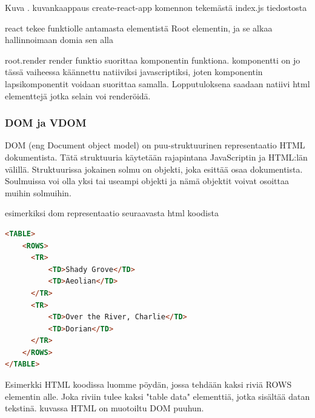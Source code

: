 Kuva \getImgCount{}. kuvankaappaus create-react-app komennon tekemästä index.js tiedostosta
\medskip

react tekee funktiolle antamasta elementistä Root elementin, ja se alkaa hallinnoimaan domia sen alla
\medskip


root.render
render funktio suorittaa komponentin funktiona. komponentti on jo tässä vaiheessa käännettu natiiviksi javascriptiksi, 
joten komponentin lapsikomponentit voidaan suorittaa samalla. Lopputuloksena saadaan natiivi html elementtejä jotka selain voi renderöidä.

\medskip

\fi


\subsubsection{DOM ja VDOM}


DOM (eng Document object model) on puu-struktuurinen representaatio HTML dokumentista.
Tätä struktuuria käytetään rajapintana JavaScriptin ja HTML:län välillä. 
Struktuurissa jokainen solmu on objekti, joka esittää osaa dokumentista. 
Soulmuissa voi olla yksi tai useampi objekti ja nämä objektit voivat osoittaa muihin solmuihin.



esimerkiksi dom representaatio seuraavasta html koodista

    
\begin{tcolorbox}
\begin{lstlisting}[language=html]
<TABLE>
    <ROWS> 
      <TR> 
          <TD>Shady Grove</TD>
          <TD>Aeolian</TD> 
      </TR> 
      <TR>
          <TD>Over the River, Charlie</TD>
          <TD>Dorian</TD> 
      </TR> 
    </ROWS>
</TABLE>
\end{lstlisting}
\end{tcolorbox}


Esimerkki HTML koodissa luomme pöydän, jossa tehdään kaksi riviä ROWS elementin alle. 
Joka riviin tulee kaksi "table data"{} elementtiä, jotka sisältää datan tekstinä.
kuvassa \nextImageCount {} HTML on muotoiltu DOM puuhun.
\bigskip




